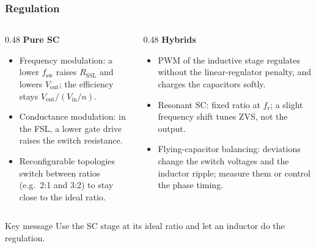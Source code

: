 \begin{frame}
	\frametitle{Regulation}
	\begin{columns}[T]
		\begin{column}{0.48\textwidth}
			\small
			\textbf{Pure SC}
			\begin{itemize}
				\item Frequency modulation: a lower $f_\mathrm{sw}$ raises $R_\mathrm{SSL}$ and lowers $V_\mathrm{out}$; the efficiency stays $V_\mathrm{out}/(V_\mathrm{in}/n)$.
				\item Conductance modulation: in the FSL, a lower gate drive raises the switch resistance.
				\item Reconfigurable topologies switch between ratios (e.g.\ 2:1 and 3:2) to stay close to the ideal ratio.
			\end{itemize}
		\end{column}
		\begin{column}{0.48\textwidth}
			\small
			\textbf{Hybrids}
			\begin{itemize}
				\item PWM of the inductive stage regulates without the linear-regulator penalty, and charges the capacitors softly.
				\item Resonant SC: fixed ratio at $f_\mathrm{r}$; a slight frequency shift tunes ZVS, not the output.
				\item Flying-capacitor balancing: deviations change the switch voltages and the inductor ripple; measure them or control the phase timing.
			\end{itemize}
		\end{column}
	\end{columns}
	\begin{block}{Key message}
		Use the SC stage at its ideal ratio and let an inductor do the regulation.
	\end{block}
\end{frame}

